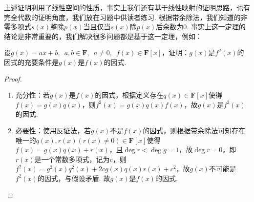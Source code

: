 上述证明利用了线性空间的性质，事实上我们还有基于线性映射的证明思路，也有完全代数的证明角度，我们放在习题中供读者练习. 根据带余除法，我们知道的非零多项式$s(x)$整除$p(x)$当且仅当$s(x)$除$p(x)$后余数为$0$. 事实上这一定理的结论是非常重要的，我们解决很多问题都是基于这一定理，例如：
\begin{example}
    设$g(x)=ax+b,\enspace a,b\in\mathbf{F},\enspace a\neq 0,\enspace
    f(x)\in \mathbf{F}[x]$，证明：$g(x)$是$f^2(x)$的因式的充要条件是$g(x)$是$f(x)$的因式.
\end{example}
\begin{proof}
    \begin{enumerate}
        \item  充分性：若$g(x)$是$f(x)$的因式，根据定义存在$q(x)\in\mathbf{F}[x]$使得$f(x)=g(x)q(x)$，则$f^2(x)=g(x)q(x)f(x)$，故$g(x)$是$f^2(x)$的因式.
        \item 必要性：使用反证法，若$g(x)$不是$f(x)$的因式，则根据带余除法可知存在唯一的$q(x),r(x)(r(x)\neq 0)\in\mathbf{F}[x]$使得$f(x)=g(x)q(x)+r(x)$，且$\deg r<\deg g=1$，故$\deg r=0$，即$r(x)$是一个常数多项式，记为$c$，则$f^2(x)=g^2(x)q^2(x)+2cg(x)q(x)r(x)+c^2$，故$g(x)$不可能是$f^2(x)$的因式，与假设矛盾. 故$g(x)$是$f(x)$的因式.
    \end{enumerate}
\end{proof}

